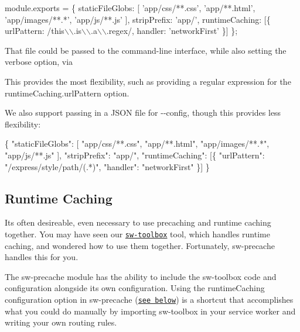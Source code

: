 \begin{DoxyCode}
module.exports = \{
  staticFileGlobs: [
    'app/css/**.css',
    'app/**.html',
    'app/images/**.*',
    'app/js/**.js'
  ],
  stripPrefix: 'app/',
  runtimeCaching: [\{
    urlPattern: /this\(\backslash\)\(\backslash\).is\(\backslash\)\(\backslash\).a\(\backslash\)\(\backslash\).regex/,
    handler: 'networkFirst'
  \}]
\};
\end{DoxyCode}


That file could be passed to the command-\/line interface, while also setting the {\ttfamily verbose} option, via




This provides the most flexibility, such as providing a regular expression for the {\ttfamily runtime\+Caching.\+url\+Pattern} option.

We also support passing in a J\+S\+ON file for {\ttfamily -\/-\/config}, though this provides less flexibility\+:


\begin{DoxyCode}
\{
  "staticFileGlobs": [
    "app/css/**.css",
    "app/**.html",
    "app/images/**.*",
    "app/js/**.js"
  ],
  "stripPrefix": "app/",
  "runtimeCaching": [\{
    "urlPattern": "/express/style/path/(.*)",
    "handler": "networkFirst"
  \}]
\}
\end{DoxyCode}


\subsection*{Runtime Caching}

It\textquotesingle{}s often desireable, even necessary to use precaching and runtime caching together. You may have seen our \href{https://github.com/GoogleChrome/sw-toolbox}{\tt {\ttfamily sw-\/toolbox}} tool, which handles runtime caching, and wondered how to use them together. Fortunately, {\ttfamily sw-\/precache} handles this for you.

The {\ttfamily sw-\/precache} module has the ability to include the {\ttfamily sw-\/toolbox} code and configuration alongside its own configuration. Using the {\ttfamily runtime\+Caching} configuration option in {\ttfamily sw-\/precache} (\href{#runtimecaching-arrayobject}{\tt see below}) is a shortcut that accomplishes what you could do manually by importing {\ttfamily sw-\/toolbox} in your service worker and writing your own routing rules.

